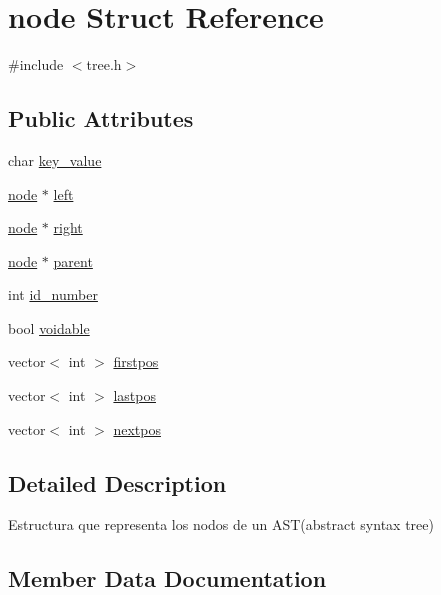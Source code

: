 \hypertarget{structnode}{}\section{node Struct Reference}
\label{structnode}


{\ttfamily \#include $<$tree.\+h$>$}

\subsection*{Public Attributes}
{\bf }\par
\begin{DoxyCompactItemize}
\item 
char \hyperlink{structnode_a8b75818ceb7869b3685f57334e5c1147}{key\+\_\+value}
\item 
\hyperlink{structnode}{node} $\ast$ \hyperlink{structnode_a7cbff55ff448f557223f79299056e9b1}{left}
\item 
\hyperlink{structnode}{node} $\ast$ \hyperlink{structnode_abdc86d4c8604c481752953af3235fc47}{right}
\item 
\hyperlink{structnode}{node} $\ast$ \hyperlink{structnode_a5e88137f1d0e2f7a940bccf4c3d3a4d3}{parent}
\item 
int \hyperlink{structnode_a984474deab8020f018902d50136ec938}{id\+\_\+number}
\item 
bool \hyperlink{structnode_a660b4cccc7107b0f760220867e3bb582}{voidable}
\item 
vector$<$ int $>$ \hyperlink{structnode_a8a41ddeb557d146334c1b0803cce0b1b}{firstpos}
\item 
vector$<$ int $>$ \hyperlink{structnode_a2b8fd11a5fb1366e46dd0a2c7428733d}{lastpos}
\item 
vector$<$ int $>$ \hyperlink{structnode_a64dedca0efaaa687a5aef97070f82c74}{nextpos}
\end{DoxyCompactItemize}



\subsection{Detailed Description}
Estructura que representa los nodos de un A\+S\+T(abstract syntax tree) 

\subsection{Member Data Documentation}
\hypertarget{structnode_a8a41ddeb557d146334c1b0803cce0b1b}{}\label{structnode_a8a41ddeb557d146334c1b0803cce0b1b} 
